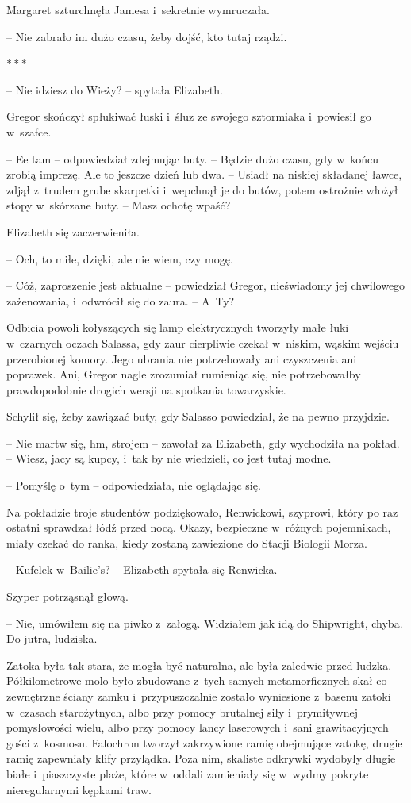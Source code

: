 \documentclass[oneside,polish,12pt,sfheadings]{mwbk}
\newcommand{\threeast}{\bigskip\par\centerline{*\,*\,*}\medskip\par}%
\begin{document}
Margaret szturchnęła Jamesa i~sekretnie wymruczała.

-- Nie zabrało im dużo czasu, żeby dojść, kto tutaj rządzi.

\threeast

-- Nie idziesz do Wieży? -- spytała Elizabeth.

Gregor skończył spłukiwać łuski i~śluz ze swojego sztormiaka i~powiesił
go w~szafce. 

-- Ee tam -- odpowiedział zdejmując buty. -- Będzie dużo
czasu, gdy w~końcu zrobią imprezę. Ale to jeszcze dzień lub dwa. --
Usiadł na niskiej składanej ławce, zdjął z~trudem grube skarpetki i~wepchnął je do butów, potem ostrożnie włożył stopy w~skórzane buty. --
Masz ochotę wpaść?

Elizabeth się zaczerwieniła. 

-- Och, to miłe, dzięki, ale nie wiem, czy
mogę.

-- Cóż, zaproszenie jest aktualne -- powiedział Gregor, nieświadomy jej
chwilowego zażenowania, i~odwrócił się do zaura. -- A~Ty?

Odbicia powoli kołyszących się lamp elektrycznych tworzyły małe łuki w~czarnych oczach Salassa, gdy zaur cierpliwie czekał w~niskim, wąskim
wejściu przerobionej komory. Jego ubrania nie potrzebowały ani
czyszczenia ani poprawek. Ani, Gregor nagle zrozumiał rumieniąc się, nie
potrzebowałby prawdopodobnie drogich wersji na spotkania towarzyskie.

Schylił się, żeby zawiązać buty, gdy Salasso powiedział, że na pewno
przyjdzie.

-- Nie martw się, hm, strojem -- zawołał za Elizabeth, gdy wychodziła na
pokład. -- Wiesz, jacy są kupcy, i~tak by nie wiedzieli, co jest tutaj
modne.

-- Pomyślę o~tym -- odpowiedziała, nie oglądając się.

Na pokładzie troje studentów podziękowało, Renwickowi, szyprowi, który
po raz ostatni sprawdzał łódź przed nocą. Okazy, bezpieczne w~różnych
pojemnikach, miały czekać do ranka, kiedy zostaną zawiezione do Stacji
Biologii Morza.

-- Kufelek w~Bailie's? -- Elizabeth spytała się Renwicka.

Szyper potrząsnął głową. 

-- Nie, umówiłem się na piwko z~załogą.
Widziałem jak idą do Shipwright, chyba. Do jutra, ludziska.

Zatoka była tak stara, że mogła być naturalna, ale była zaledwie
przed-ludzka. Półkilometrowe molo było zbudowane z~tych samych
metamorficznych skał co zewnętrzne ściany zamku i~przypuszczalnie
zostało wyniesione z~basenu zatoki w~czasach starożytnych, albo przy
pomocy brutalnej siły i~prymitywnej pomysłowości wielu, albo przy pomocy
lancy laserowych i~sani grawitacyjnych gości z~kosmosu. Falochron
tworzył zakrzywione ramię obejmujące zatokę, drugie ramię zapewniały
klify przylądka. Poza nim, skaliste odkrywki wydobyły długie białe i~piaszczyste plaże, które w~oddali zamieniały się w~wydmy pokryte
nieregularnymi kępkami traw.
\end{document}
